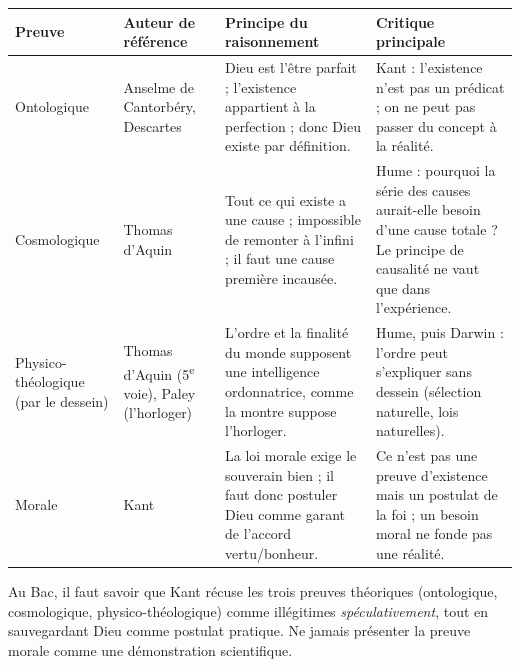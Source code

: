 \documentclass[11pt]{article}
\begin{document}
\begin{corrige}

\begin{center}
\begin{tabularx}{\linewidth}{|l|X|X|X|}
\hline
\rowcolor{popblueL} \textbf{Preuve} & \textbf{Auteur de référence} & \textbf{Principe du raisonnement} & \textbf{Critique principale} \\
\hline
Ontologique & Anselme de Cantorbéry, Descartes & Dieu est l'être parfait ; l'existence appartient à la perfection ; donc Dieu existe par définition. & Kant : l'existence n'est pas un prédicat ; on ne peut pas passer du concept à la réalité. \\
\hline
Cosmologique & Thomas d'Aquin & Tout ce qui existe a une cause ; impossible de remonter à l'infini ; il faut une cause première incausée. & Hume : pourquoi la série des causes aurait-elle besoin d'une cause totale ? Le principe de causalité ne vaut que dans l'expérience. \\
\hline
Physico-théologique (par le dessein) & Thomas d'Aquin (5\textsuperscript{e} voie), Paley (l'horloger) & L'ordre et la finalité du monde supposent une intelligence ordonnatrice, comme la montre suppose l'horloger. & Hume, puis Darwin : l'ordre peut s'expliquer sans dessein (sélection naturelle, lois naturelles). \\
\hline
Morale & Kant & La loi morale exige le souverain bien ; il faut donc postuler Dieu comme garant de l'accord vertu/bonheur. & Ce n'est pas une preuve d'existence mais un postulat de la foi ; un besoin moral ne fonde pas une réalité. \\
\hline
\end{tabularx}
\end{center}
\end{corrige}
\begin{attention}
Au Bac, il faut savoir que Kant récuse les trois preuves théoriques (ontologique, cosmologique, physico-théologique) comme illégitimes \emph{spéculativement}, tout en sauvegardant Dieu comme postulat pratique. Ne jamais présenter la preuve morale comme une démonstration scientifique.
\end{attention}
\end{document}
